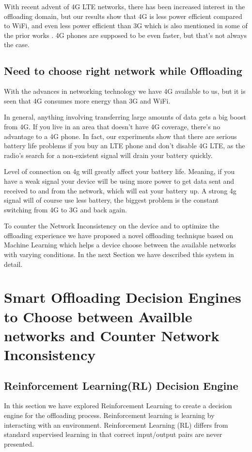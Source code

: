 \documentclass{report}
\begin{document}
With recent advent of 4G LTE networks, there has been increased interest in the offloading domain, but our results show that 4G is less power efficient compared to WiFi, and even less power efficient than 3G which is also mentioned in some of the prior works \cite{huang2012close}.
4G phones are supposed to be even faster, but that's not always the case.

\section{Need to choose right network while Offloading}
With the advances in networking technology we have 4G available to us, but it is seen that 4G consumes more energy than 3G and WiFi.

In general, anything involving transferring large amounts of data gets a big boost from 4G. If you live in an area that doesn't have 4G coverage, there's no advantage to a 4G phone. In fact, our experiments show that there are serious battery life problems if you buy an LTE phone and don't disable 4G LTE, as the radio's search for a non-existent signal will drain your battery quickly.

Level of connection on 4g will greatly affect your battery life. Meaning, if you have a weak signal your device will be using more power to get data sent and received to and from the network, which will eat your battery up. A strong 4g signal will of course use less battery, the biggest problem is the constant switching from 4G to 3G and back again.


To counter the Network Inconsistency on the device and to optimize the offloading experience we have proposed a novel offloading technique based on Machine Learning which helps a device choose between the available networks with varying conditions. In the next Section we have described this system in detail.

\chapter{Smart Offloading Decision Engines to Choose between Availble networks and Counter Network Inconsistency}
\label{chap:SmartDecisionEngine}

\section{Reinforcement Learning(RL) Decision Engine}
In this section we have explored Reinforcement Learning to create a decision engine for the offloading
process. Reinforcement learning is learning by interacting with an environment. Reinforcement Learning
(RL) differs from standard supervised learning in that correct input/output pairs are never presented.
\end{document}
